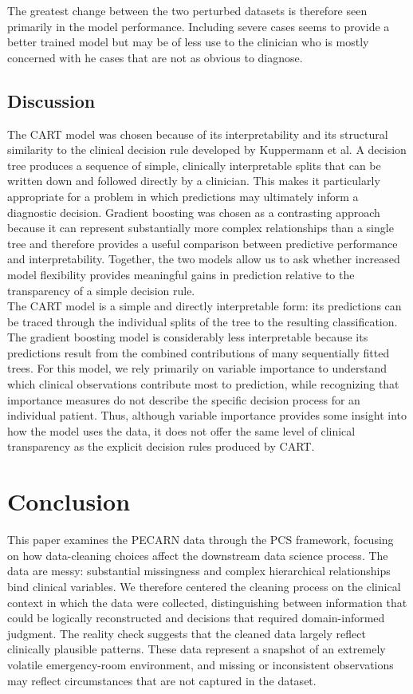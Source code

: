 \documentclass[10pt,letterpaper]{article}
\begin{document}
The greatest change between the two perturbed datasets is therefore seen primarily in the model performance. Including severe cases seems to provide a better trained model but may be of less use to the clinician who is mostly concerned with he cases that are not as obvious to diagnose. 

\subsection{Discussion}
The CART model was chosen because of its interpretability and its structural similarity to the clinical decision rule developed by Kuppermann et al. A decision tree produces a sequence of simple, clinically interpretable splits that can be written down and followed directly by a clinician. This makes it particularly appropriate for a problem in which predictions may ultimately inform a diagnostic decision. Gradient boosting was chosen as a contrasting approach because it can represent substantially more complex relationships than a single tree and therefore provides a useful comparison between predictive performance and interpretability. Together, the two models allow us to ask whether increased model flexibility provides meaningful gains in prediction relative to the transparency of a simple decision rule.\\

The CART model is a simple and directly interpretable form: its predictions can be traced through the individual splits of the tree to the resulting classification. The gradient boosting model is considerably less interpretable because its predictions result from the combined contributions of many sequentially fitted trees. For this model, we rely primarily on variable importance to understand which clinical observations contribute most to prediction, while recognizing that importance measures do not describe the specific decision process for an individual patient. Thus, although variable importance provides some insight into how the model uses the data, it does not offer the same level of clinical transparency as the explicit decision rules produced by CART.


\section{Conclusion}\label{conclusion}

This paper examines the PECARN data through the PCS framework, focusing on how data-cleaning choices affect the downstream data science process. The data are messy: substantial missingness and complex hierarchical relationships bind clinical variables. We therefore centered the cleaning process on the clinical context in which the data were collected, distinguishing between information that could be logically reconstructed and decisions that required domain-informed judgment. The reality check suggests that the cleaned data largely reflect clinically plausible patterns. These data represent a snapshot of an extremely volatile emergency-room environment, and missing or inconsistent observations may reflect circumstances that are not captured in the dataset.\\
\end{document}
